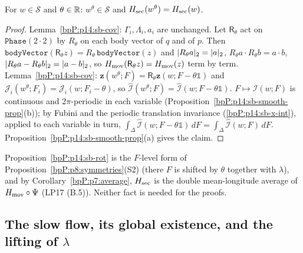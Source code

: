 \begin{proposition}\label{bpP:p14:sb-rot}
For $w\in\mathcal S$ and $\theta\in\mathbb{R}$: $w^\theta\in\mathcal S$ and $H_{\rm sec}(w^\theta)=H_{\rm sec}(w)$.
\end{proposition}
\begin{proof}
\label{stepP:p14:sb-rot-1} Lemma~\ref{bpP:p14:sb-cov}: $\Gamma_i,\Lambda_i,a_i$ are unchanged.
\label{stepP:p14:sb-rot-2} Let $\mathsf R_\theta$ act on $\texttt{Phase}(2\cdot2)$ by $R_\theta$ on each body vector of $q$ and of $p$. Then $\texttt{bodyVector}(\mathsf R_\theta z)=R_\theta\,\texttt{bodyVector}(z)$ and $\lvert R_\theta a\rvert_2=\lvert a\rvert_2$, $R_\theta a\cdot R_\theta b=a\cdot b$, $\lvert R_\theta a-R_\theta b\rvert_2=\lvert a-b\rvert_2$, so $H_{\rm mov}(\mathsf R_\theta z)=H_{\rm mov}(z)$ term by term.
\label{stepP:p14:sb-rot-3} Lemma~\ref{bpP:p14:sb-cov}: $\mathbf z(w^\theta;F)=\mathsf R_\theta\mathbf z(w;F-\theta\mathbb 1)$ and $\mathcal J_i(w^\theta;F_i)=\mathcal J_i(w;F_i-\theta)$, so $\widehat{\mathcal I}(w^\theta;F)=\widehat{\mathcal I}(w;F-\theta\mathbb 1)$.
\label{stepP:p14:sb-rot-4} $F\mapsto\widehat{\mathcal I}(w;F)$ is continuous and $2\pi$-periodic in each variable (Proposition~\ref{bpP:p14:sb-smooth-prop}(b)); by Fubini and the periodic translation invariance (\ref{bpP:p14:sb-x-int}), applied to each variable in turn, $\int_\Delta\widehat{\mathcal I}(w;F-\theta\mathbb 1)\,dF=\int_\Delta\widehat{\mathcal I}(w;F)\,dF$. Proposition~\ref{bpP:p14:sb-smooth-prop}(a) gives the claim.
\end{proof}

\begin{remark}\label{bpP:p14:sb-consistency}
Proposition~\ref{bpP:p14:sb-rot} is the $F$-level form of Proposition~\ref{bpP:p8:symmetries}(S2) (there $F$ is shifted by $\theta$ together with $\lambda$), and by Corollary~\ref{bpP:p7:average}, $H_{\rm sec}$ is the double mean-longitude average of $H_{\rm mov}\circ\Psi$ (LP17 (B.5)). Neither fact is needed for the proofs.
\end{remark}

\subsection{The slow flow, its global existence, and the lifting of $\lambda$}\label{bpP:p14:sb-flow}

